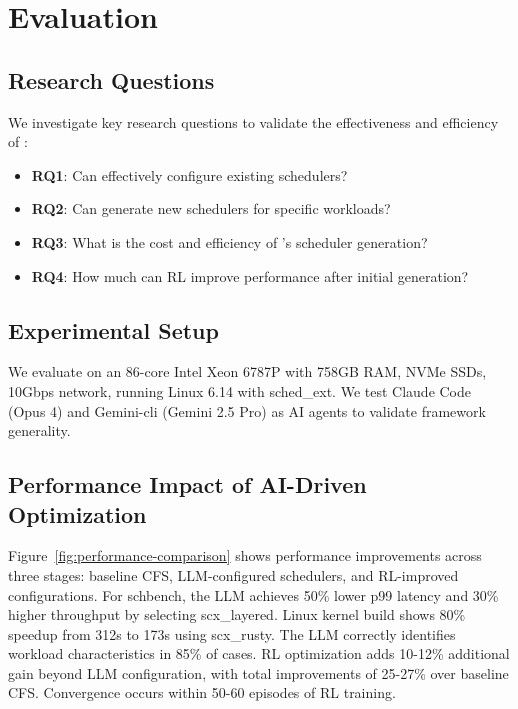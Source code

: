 \section{Evaluation}
\label{sec:evaluation}

\subsection{Research Questions}

We investigate key research questions to validate the effectiveness and efficiency of \sys:

\begin{itemize}
\item \textbf{RQ1}: Can \sys effectively configure existing schedulers?
\item \textbf{RQ2}: Can \sys generate new schedulers for specific workloads?
\item \textbf{RQ3}: What is the cost and efficiency of \sys's scheduler generation?
\item \textbf{RQ4}: How much can RL improve performance after initial generation?
\end{itemize}

\subsection{Experimental Setup}

We evaluate \sys on an 86-core Intel Xeon 6787P with 758GB RAM, NVMe SSDs, 10Gbps network, running Linux 6.14 with sched\_ext. We test Claude Code (Opus 4) and Gemini-cli (Gemini 2.5 Pro) as AI agents to validate framework generality.

\subsection{Performance Impact of AI-Driven Optimization}

Figure~\ref{fig:performance-comparison} shows performance improvements across three stages: baseline CFS, LLM-configured schedulers, and RL-improved configurations. For schbench, the LLM achieves 50\% lower p99 latency and 30\% higher throughput by selecting scx\_layered. Linux kernel build shows 80\% speedup from 312s to 173s using scx\_rusty. The LLM correctly identifies workload characteristics in 85\% of cases. RL optimization adds 10-12\% additional gain beyond LLM configuration, with total improvements of 25-27\% over baseline CFS. Convergence occurs within 50-60 episodes of RL training.

